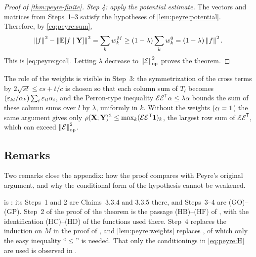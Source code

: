 \begin{proof}[Proof of \cref{thm:peyre-finite}]
\emph{Step 4: apply the potential estimate.} The vectors and matrices from
Steps~1--3 satisfy the hypotheses of \cref{lem:peyre:potential}. Therefore,
by \eqref{eq:peyre:sum},
\[
 \left\|f\right\|^2-\left\|\mathbb E[f\mid\mathbf Y]\right\|^2
 =\sum_kw_k^M\ge(1-\lambda)\sum_kw_k^0
 =(1-\lambda)\left\|f\right\|^2.
\]
This is \eqref{eq:peyre:goal}. Letting $\lambda$ decrease to
$\left\|\mathcal E\right\|_{\mathrm{op}}^2$ proves the theorem.
\end{proof}

The role of the weights is visible in Step~3: the symmetrization of the
cross terms by $2\sqrt{st}\le cs+t/c$ is chosen so that each column sum of
$T_l$ becomes $(\varepsilon_{kl}/\alpha_k)\sum_i\varepsilon_{il}\alpha_i$, and the
Perron-type inequality $\mathcal E\mathcal E^{\mathsf T}\alpha\le\lambda\alpha$
bounds the sum of these column sums over $l$ by $\lambda$, uniformly in $k$.
Without the weights ($\alpha=\mathbf 1$) the same argument gives only
$\rho(\mathbf X;\mathbf Y)^2\le\max_k(\mathcal E\mathcal E^{\mathsf
T}\mathbf 1)_k$, the largest row sum of $\mathcal E\mathcal E^{\mathsf T}$, which
can exceed $\left\|\mathcal E\right\|_{\mathrm{op}}^2$.

\subsection{Remarks}

Two remarks close the appendix: how the proof compares with
Peyre's original argument, and why the conditional form of the
hypothesis cannot be weakened.

\begin{remark}\label{rem:peyre:source}
 is \cite[Lemma~3.3.3]{Peyre}: its Steps~1 and 2 are
Claims~3.3.4 and 3.3.5 there, and Steps~3--4 are (GO)--(GP). Step~2 of the
proof of the theorem is the passage (HB)--(HF) of \cite{Peyre}, with the
identification (HC)--(HD) of the functions used there. Step~4 replaces the
induction on $M$ in the proof of \cite[Lemma~3.3.7]{Peyre}, and
\cref{lem:peyre:weights} replaces \cite[Lemma~3.8.1]{Peyre}, of which only
the easy inequality ``$\le$'' is needed. That only the conditionings in
\eqref{eq:peyre:H} are used is observed in \cite[\S3.4.a]{Peyre}.
\end{remark}

